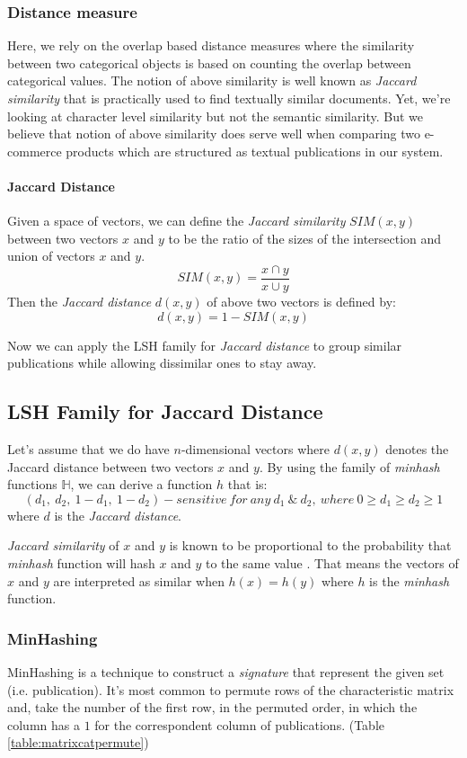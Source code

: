 \documentclass[a4paper,12pt,oneside]{book}
\theoremstyle{definition}
\theoremstyle{remark}
\begin{document}
\subsubsection{Distance measure}
Here, we rely on the overlap based distance measures where the similarity between two categorical objects is based on counting the overlap between categorical values. The notion of above similarity is well known as \emph{Jaccard similarity} that is practically used to find textually similar documents. Yet, we're looking at character level similarity but not the semantic similarity. But we believe that notion of above similarity does serve well when comparing two e-commerce products which are structured as textual publications in our system.

\paragraph*{Jaccard Distance}
Given a space of vectors, we can define the \emph{Jaccard similarity} $SIM(x,y)$ between two vectors $x$ and $y$ to be the ratio of the sizes of the intersection and union of vectors $x$ and $y$. 
\[ SIM(x,y)=\frac{x \cap y}{x \cup y}\]
Then the \emph{Jaccard distance} $d(x,y)$ of above two vectors is defined by:
\[ d(x,y)=1-SIM(x,y)\]

Now we can apply the \ac{LSH} family for \emph{Jaccard distance} to group similar publications while allowing dissimilar ones to stay away. 

\subsection{LSH Family for Jaccard Distance}
\label{sec:lshjaccard}
Let's assume that we do have $n$-dimensional vectors where $d(x,y)$ denotes the Jaccard distance between two vectors $x$ and $y$. By using the family of \emph{minhash} functions $\mathbb{H}$, we can derive a function $h$ that is:
\[ (d_1,\ d_2,\ 1-d_1,\ 1-d_2)-sensitive\ for\ any\ d_1\ \& \ d_2,\ where\ 0 \geq d_1 \geq d_2 \geq 1\]
where $d$ is the \emph{Jaccard distance}.

\emph{Jaccard similarity} of $x$ and $y$ is known to be proportional to the probability that \emph{minhash} function will hash $x$ and $y$ to the same value \cite{AnandRajaramanandJeffUllman}. That means the vectors of $x$ and $y$ are interpreted as similar when $h(x)=h(y)$ where $h$ is the \emph{minhash} function.

\subsubsection{MinHashing}
MinHashing is a technique to construct a \emph{signature} that represent the given set (i.e. publication). It's most common to permute rows of the characteristic matrix and, take the number of the first row, in the permuted order, in which the column has a $1$ for the correspondent column of publications. (Table \ref{table:matrixcatpermute})
\end{document}
